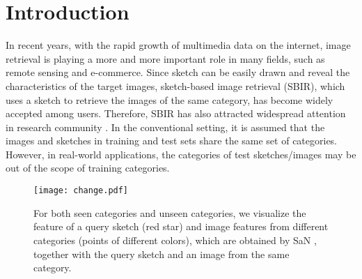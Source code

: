 \documentclass[10pt,twocolumn,letterpaper]{article}
\begin{document}
\section{Introduction}
In recent years, with the rapid growth of multimedia data on the internet, image retrieval is playing a more and more important role in many fields, such as remote sensing and e-commerce. 
Since sketch can be easily drawn and reveal the characteristics of the target images, sketch-based image retrieval (SBIR), which uses a sketch to retrieve the images of the same category, has become widely accepted among users. 
Therefore, SBIR has also attracted widespread attention in research community \cite{del1997visual, cao2010mindfinder, eitz2010evaluation, eitz2010sketch, cao2011edgel, hu2011bag, zhou2012sketch, hu2013performance, cao2013sym, parui2014similarity, james2014reenact, wang2015sketch, saavedra2015sketch, li2016fine, yu2016sketch, qi2016sketch, sangkloy2016sketchy, lu2018learning, saavedra2014sketch}. 
In the conventional setting, it is assumed that the images and sketches in training and test sets share the same set of categories.
However, in real-world applications, the categories of test sketches/images may be out of the scope of training categories.

\begin{figure}
\centering
\texttt{[image: change.pdf]}
   \caption{For both seen categories and unseen categories, we visualize the feature of a query sketch (red star) and image features from different categories (points of different colors), which are obtained by SaN \cite{yu2017sketch}, together with the query sketch and an image from the same category.}
\label{fig:inshort}
\vspace{-15pt}
\end{figure}
\end{document}
